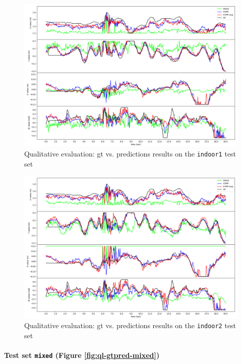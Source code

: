 \begin{figure}[!h]
	\centering
	\includegraphics[width=1 \textwidth]{"contents/images/06-gtpred-indoor1"}
	\caption[Qualitative evaluation: \gls{gt} vs. predictions results on the \texttt{indoor1} test set]{Qualitative evaluation: \gls{gt} vs. predictions results on the \texttt{indoor1} test set}
	\label{fig:ql-gtpred-indoor1}
\end{figure}

\begin{figure}[H]
	\centering
	\includegraphics[width=1 \textwidth]{"contents/images/06-gtpred-indoor2"}
	\caption[Qualitative evaluation: \gls{gt} vs. predictions results on the \texttt{indoor2} test set]{Qualitative evaluation: \gls{gt} vs. predictions results on the \texttt{indoor2} test set}
	\label{fig:ql-gtpred-indoor2}
\end{figure}


\paragraph*{Test set \texttt{mixed} (Figure \ref{fig:ql-gtpred-mixed})}

